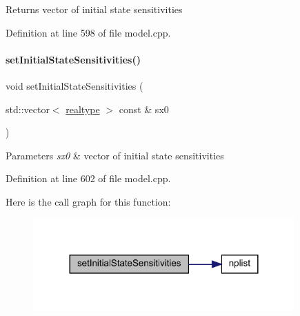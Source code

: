 \begin{DoxyReturn}{Returns}
vector of initial state sensitivities 
\end{DoxyReturn}


Definition at line 598 of file model.\+cpp.

\mbox{\label{classamici_1_1_model_a82941b121d9db31d357642092a2cd41d}} 
\paragraph{\texorpdfstring{set\+Initial\+State\+Sensitivities()}{setInitialStateSensitivities()}}
{\footnotesize\ttfamily void set\+Initial\+State\+Sensitivities (\begin{DoxyParamCaption}\item[{std\+::vector$<$ \mbox{\hyperlink{namespaceamici_a1bdce28051d6a53868f7ccbf5f2c14a3}{realtype}} $>$ const \&}]{sx0 }\end{DoxyParamCaption})}


\begin{DoxyParams}{Parameters}
{\em sx0} & vector of initial state sensitivities \\
\hline
\end{DoxyParams}


Definition at line 602 of file model.\+cpp.

Here is the call graph for this function\+:
\nopagebreak
\begin{figure}[H]
\begin{center}
\leavevmode
\includegraphics[width=284pt]{classamici_1_1_model_a82941b121d9db31d357642092a2cd41d_cgraph}
\end{center}
\end{figure}
\mbox{\label{classamici_1_1_model_a223e567004c82b5facc2fe98cdd16855}} 
